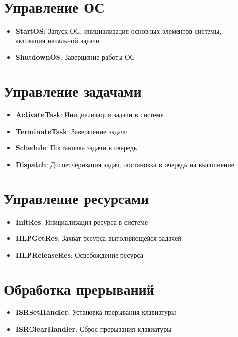 \documentclass[14pt, draft, oneside]{extreport}
\begin{document}
\section{Управление ОС}
\begin{itemize}
    \item \textbf{StartOS}: Запуск ОС, инициализация основных
        элементов системы, активация начальной задачи
    \item \textbf{ShutdownOS}: Завершение работы ОС
\end{itemize}

\section{Управление задачами}

\begin{itemize}
    \item \textbf{ActivateTask}: Инициализация задачи в системе
    \item \textbf{TerminateTask}: Завершение задачи
    \item \textbf{Schedule}: Постановка задачи в очередь
    \item \textbf{Dispatch}: Диспетчеризация задач, постановка в 
        очередь на выполнение
\end{itemize}

\section{Управление ресурсами}

\begin{itemize}
    \item \textbf{InitRes}: Инициализация ресурса в системе
    \item \textbf{HLPGetRes}: Захват ресурса выполняющейся задачей
    \item \textbf{HLPReleaseRes}: Освобождение ресурса
\end{itemize}

\section{Обработка прерываний}

\begin{itemize}
    \item \textbf{ISRSetHandler}: Установка прерывания клавиатуры
    \item \textbf{ISRClearHandler}: Сброс прерывания клавиатуры
\end{itemize}
\end{document}
